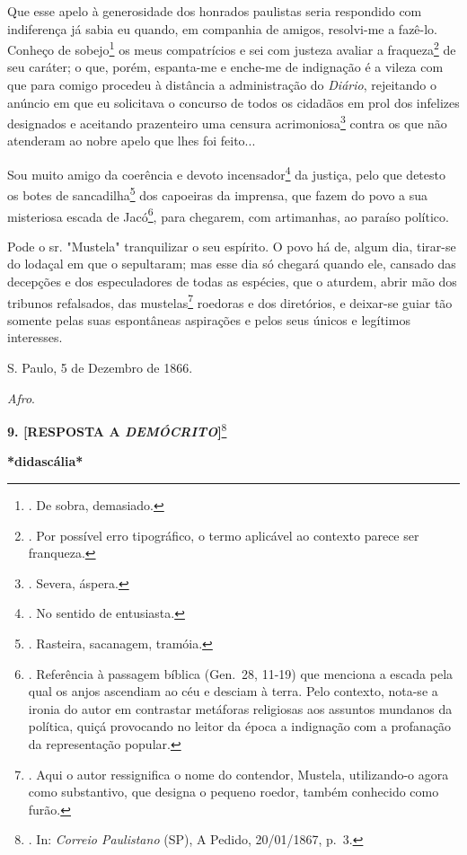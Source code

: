 Que esse apelo à generosidade dos honrados paulistas seria respondido
com indiferença já sabia eu quando, em companhia de amigos, resolvi-me a
fazê-lo. Conheço de sobejo\footnote{. De sobra, demasiado.} os meus
compatrícios e sei com justeza avaliar a fraqueza\footnote{. Por
  possível erro tipográfico, o termo aplicável ao contexto parece ser
  franqueza.} de seu caráter; o que, porém, espanta-me e enche-me de
indignação é a vileza com que para comigo procedeu à distância a
administração do \emph{Diário}, rejeitando o anúncio em que eu
solicitava o concurso de todos os cidadãos em prol dos infelizes
designados e aceitando prazenteiro uma censura acrimoniosa\footnote{.
  Severa, áspera.} contra os que não atenderam ao nobre apelo que lhes
foi feito...

Sou muito amigo da coerência e devoto incensador\footnote{. No sentido
  de entusiasta.} da justiça, pelo que detesto os botes de
sancadilha\footnote{. Rasteira, sacanagem, tramóia.} dos capoeiras da
imprensa, que fazem do povo a sua misteriosa escada de Jacó\footnote{.
  Referência à passagem bíblica (Gen.~28, 11-19) que menciona a escada
  pela qual os anjos ascendiam ao céu e desciam à terra. Pelo contexto,
  nota-se a ironia do autor em contrastar metáforas religiosas aos
  assuntos mundanos da política, quiçá provocando no leitor da época a
  indignação com a profanação da representação popular.}, para chegarem,
com artimanhas, ao paraíso político.

Pode o sr. "Mustela" tranquilizar o seu espírito. O povo há de, algum
dia, tirar-se do lodaçal em que o sepultaram; mas esse dia só chegará
quando ele, cansado das decepções e dos especuladores de todas as
espécies, que o aturdem, abrir mão dos tribunos refalsados, das
mustelas\footnote{. Aqui o autor ressignifica o nome do contendor,
  Mustela, utilizando-o agora como substantivo, que designa o pequeno
  roedor, também conhecido como furão.} roedoras e dos diretórios, e
deixar-se guiar tão somente pelas suas espontâneas aspirações e pelos
seus únicos e legítimos interesses.

S. Paulo, 5 de Dezembro de 1866.

\emph{Afro}.

\textbf{9. {[}RESPOSTA A \emph{DEMÓCRITO}{]}}\footnote{. In:
  \emph{Correio Paulistano} (SP), A Pedido, 20/01/1867, p.~3.}

\textbf{*didascália*}


